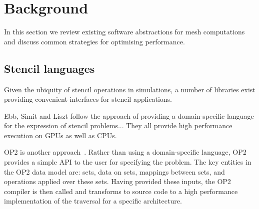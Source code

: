 \section{Background}

In this section we review existing software abstractions for mesh computations and discuss common strategies for optimising performance.

\subsection{Stencil languages}
\label{sec:stencillang}



Given the ubiquity of stencil operations in simulations, a number of libraries exist providing convenient interfaces for stencil applications.


Ebb, Simit and Liszt follow the approach of providing a domain-specific language for the expression of stencil problems...
They all provide high performance execution on GPUs as well as CPUs.


OP2 is another approach~\cite{mudaligeOP2ActiveLibrary2012,mudaligeDesignInitialPerformance2013}.
Rather than using a domain-specific language, OP2 provides a simple API to the user for specifying the problem.
The key entities in the OP2 data model are: sets, data on sets, mappings between sets, and operations applied over these sets.
Having provided these inputs, the OP2 compiler is then called and transforms to source code to a high performance implementation of the traversal for a specific architecture.



